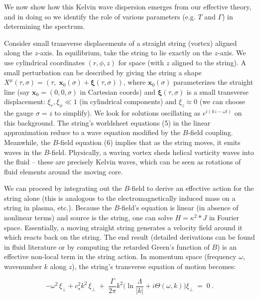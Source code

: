 \documentclass[12pt]{article}
\begin{document}
We now show how this Kelvin wave dispersion emerges from our effective theory, and in doing so we identify the role of various parameters (e.g. $T$ and $\Gamma$) in determining the spectrum. 

Consider small transverse displacements of a straight string (vortex) aligned along the $z$-axis. In equilibrium, take the string to lie exactly on the $z$-axis. We use cylindrical coordinates $(r,\phi,z)$ for space (with $z$ aligned to the string). A small perturbation can be described by giving the string a shape $X^\mu(\tau,\sigma) = (\tau, \; \mathbf{x}_0(\sigma) + \mathbf{\xi}(\tau,\sigma))$, where $\mathbf{x}_0(\sigma)$ parameterizes the straight line (say $\mathbf{x}_0 = (0,0,\sigma)$ in Cartesian coords) and $\mathbf{\xi}(\tau,\sigma)$ is a small transverse displacement: $\xi_r, \xi_\phi \ll 1$ (in cylindrical components) and $\xi_z \approx 0$ (we can choose the gauge $\sigma = z$ to simplify). We look for solutions oscillating as $e^{i(kz - \omega t)}$ on this background. The string’s worldsheet equations (5) in the linear approximation reduce to a wave equation modified by the $B$-field coupling. Meanwhile, the $B$-field equation (6) implies that as the string moves, it emits waves in the $B$-field. Physically, a waving vortex sheds helical vorticity waves into the fluid – these are precisely Kelvin waves, which can be seen as rotations of fluid elements around the moving core.

We can proceed by integrating out the $B$-field to derive an effective action for the string alone (this is analogous to the electromagnetically induced mass on a string in plasma, etc.). Because the $B$-field’s equation is linear (in absence of nonlinear terms) and source is the string, one can solve $H = \kappa^2 *J$ in Fourier space. Essentially, a moving straight string generates a velocity field around it which reacts back on the string. The end result (detailed derivations can be found in fluid literature or by computing the retarded Green’s function of $B$) is an effective non-local term in the string action. In momentum space (frequency $\omega$, wavenumber $k$ along $z$), the string’s transverse equation of motion becomes: 

\[ -\omega^2 \,\xi_\perp + c_\star^2 k^2\, \xi_\perp \;+\; \frac{\Gamma}{2\pi} k^2 \Big(\ln\frac{\Lambda}{|k|} + i\Theta(\omega,k)\Big)\xi_\perp \;=\;0~. \tag{9}\]
\end{document}
